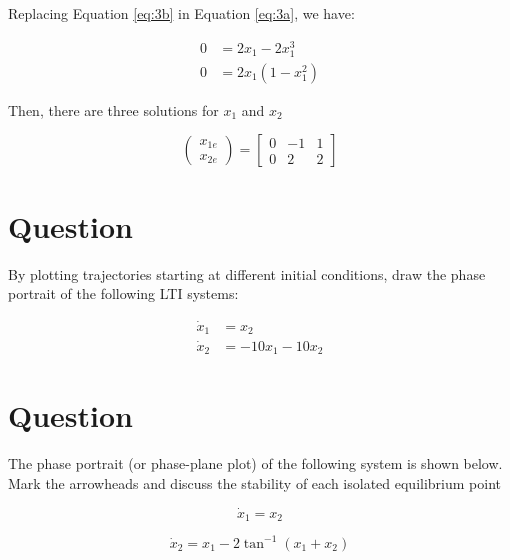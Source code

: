 \documentclass[a4paper,10pt]{article}
\begin{document}
Replacing Equation \ref{eq:3b} in Equation \ref{eq:3a}, we have:

\begin{eqnarray*}
0 &= 2{x}_1 - 2{x}^3_1 \\
0 &= 2{x}_1(1 - {x}^2_1)
\end{eqnarray*}

Then, there are three solutions for $x_1$ and $x_2$

\begin{equation}
\begin{pmatrix}
x_{1e}\\x_{2e}
\end{pmatrix}=
\begin{bmatrix}
 0 & -1 & 1 \\
 0 & 2 & 2 
\end{bmatrix}
\end{equation}



\section{Question}
By plotting trajectories starting at different initial conditions, draw the phase portrait of the following LTI systems:

\begin{eqnarray}
\dot{x}_1 &= {x}_2 \\
\dot{x}_2 &= -10{x}_1-10{x}_2  
\end{eqnarray}



\section{Question}
The phase portrait (or phase-plane plot) of the following system is shown below.
Mark the arrowheads and discuss the stability of each isolated equilibrium point


\begin{equation}
\dot{x}_1 = {x}_2 
\end{equation}

\begin{equation}
\dot{x}_2 = {x}_1-2\tan^{-1}({x}_1+{x}_2) 
\end{equation}
\end{document}
